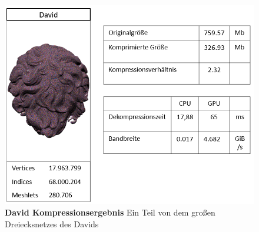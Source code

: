 \begin{figure}[htb]
  \centering  
  \includegraphics[scale=0.7]{Bilder/david_ergebnis.png}
  \caption[David Kompressionsergebnis]{\textbf{David Kompressionsergebnis} Ein Teil von dem großen Dreiecksnetzes des Davids }
  \label{fig:david_ergebnis}
\end{figure}


